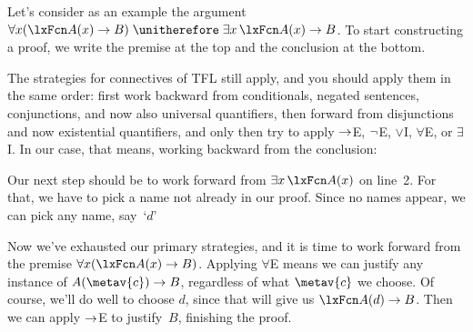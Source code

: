 Let's consider as an example the argument $\forall x(\atom{A}{x} \eif B) \therefore \exists x\,\atom{A}{x} \eif B$. To start constructing a proof, we write the premise at the top and the conclusion at the bottom.
\begin{fitchproof}
\PR
\ellipsesline
{}
\end{fitchproof}
The strategies for connectives of TFL still apply, and you should apply them in the same order: first work backward from conditionals, negated sentences, conjunctions, and now also universal quantifiers, then forward from disjunctions and now existential quantifiers, and only then try to apply $\rightarrow$E, $\neg$E, $\lor$I, $\forall$E, or $\exists$I. In our case, that means, working backward from the conclusion:
\begin{fitchproof}
	\PR
	\open
	\AS
	\ellipsesline
	\close
\end{fitchproof}
Our next step should be to work forward from $\exists x\,\atom{A}{x}$ on line~2. For that, we have to pick a name not already in our proof. Since no names appear, we can pick any name, say~`$d$'
\begin{fitchproof}
	\PR
	\open
	\AS
	\open
	\AS
	\ellipsesline
	\close
	\close
\end{fitchproof}
Now we've exhausted our primary strategies, and it is time to work forward from the premise $\forall x(\atom{A}{x} \eif B)$. Applying $\forall$E means we can justify any instance of $A(\metav{c}) \eif B$, regardless of what $\metav{c}$ we choose. Of course, we'll do well to choose $d$, since that will give us $\atom{A}{d} \eif B$. Then we can apply $\rightarrow$E to justify~$B$, finishing the proof.
\begin{fitchproof}
	\PR
	\open
	\AS
	\open
	\AS
{}
	\close
	\close
\end{fitchproof}

